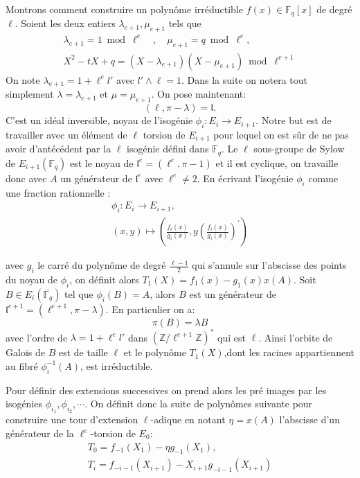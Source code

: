 \documentclass[10pt,a4paper]{book}
\theoremstyle{plain}
\theoremstyle{definition}
\theoremstyle{definition}
\theoremstyle{definition}
\theoremstyle{definition}
\theoremstyle{remark}
\theoremstyle{remark}
\theoremstyle{definition}
\begin{document}
Montrons comment construire un polynôme irréductible $f(x) \in \mathbb{F}_q[x]$ de degré $\ell$. Soient  les deux entiers $\lambda_{e+1}, \mu_{e+1}$ tels que 
\begin{align*}
\lambda_{e+1}=1 \bmod \ell^{e} \quad , \quad \mu_{e+1}=q \bmod \ell^e, \\
X^2-tX+q = (X-\lambda_{e+1})(X-\mu_{e+1}) \bmod \ell^{e+1} 
\end{align*}
On note $\lambda_{e+1}=1+\ell^el'$ avec $l' \wedge \ell = 1$. Dans la suite on notera tout simplement $\lambda=\lambda_{e+1}$ et $\mu = \mu_{e+1}$. On pose maintenant:
\begin{equation*}
(\ell,\pi-\lambda)=\mathfrak{l}.
\end{equation*}
C'est un idéal inversible, noyau de l'isogénie $\phi_{i}:E_i \to E_{i+1}$. Notre but est de travailler avec un élément de $\ell$ torsion de $E_{i+1}$ pour lequel on est sûr de ne pas avoir d'antécédent par la $\ell$ isogénie défini dans $\mathbb{F}_q$. Le $\ell$ sous-groupe de Sylow de $E_{i+1}(\mathbb{F}_q)$ est le noyau de $\mathfrak{l}^e=(\ell^e,\pi - 1)$ et il est cyclique, on travaille donc avec $A$ un générateur de $\mathfrak{l}^e$ avec $\ell^e \neq 2$. En écrivant l'isogénie $\phi_i$ comme une fraction rationnelle : 
\begin{align*}
\phi_{i}:E_i \to E_{i+1}, \\
(x,y) \mapsto \left( \frac{f_{i}(x)}{g_{i}(x)} ,y \left( \frac{f_{i}(x)}{g_{i}(x)} \right) ^{'} \right)
\end{align*}

avec $g_i$ le carré du polynôme de degré $\frac{\ell-1}{2}$  qui s'annule sur l'abscisse des points du noyau de $\phi_{i}$, on  définit alors $ T_{1}(X)=f_{1}(x)-g_{1}(x)x(A)$. Soit $B \in E_i(\overline{\mathbb{F}_q})$ tel que $\phi_i(B)=A$, alors  $B$ est un générateur de $\mathfrak{l}^{e+1}=(\ell^{e+1},\pi-\lambda)$. En particulier on a:
\begin{equation*}
\pi(B)=\lambda B
\end{equation*}
avec l'ordre de $\lambda=1+\ell^el'$ dans $(\mathbb{Z}/\ell^{e+1}\mathbb{Z})^*$ qui est $\ell$. Ainsi l'orbite de Galois de $B$ est de taille $\ell$ et le polynôme $T_{1}(X)$,dont les racines appartiennent au fibré $\phi_i^{-1}(A)$, est irréductible. 

Pour définir des extensions successives on prend alors les pré images par les isogénies $\phi_{i_1},\phi_{i_2}, \cdots$. On définit donc la suite de polynômes suivante pour construire une tour d'extension $\ell$-adique en notant $\eta =x(A)$ l'abscisse d'un générateur de la $\ell^e$-torsion de $E_0$:
\begin{align*}
T_0=f_{-1}(X_1)-\eta g_{-1}(X_1), \\
T_i=f_{-i-1}(X_{i+1})-X_{i+1}g_{-i-1}(X_{i+1})
\end{align*}
\end{document}
